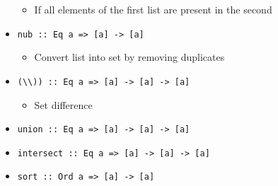 \begin{itemize}
        \begin{itemize}
            \item If all elements of the first list are present in the second
        \end{itemize}
    \item \verb+nub :: Eq a => [a] -> [a]+
        \begin{itemize}
            \item Convert list into set by removing duplicates
        \end{itemize}
    \item \verb+(\\)) :: Eq a => [a] -> [a] -> [a]+
        \begin{itemize}
            \item Set difference
        \end{itemize}
    \item \verb+union :: Eq a => [a] -> [a] -> [a]+
    \item \verb+intersect :: Eq a => [a] -> [a] -> [a]+
    \item \verb+sort :: Ord a => [a] -> [a]+
\end{itemize}
